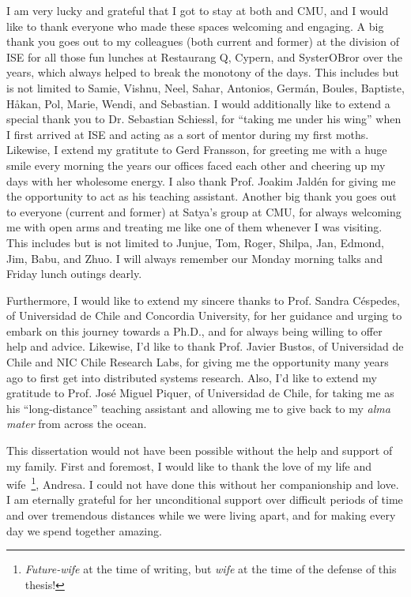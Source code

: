I am very lucky and grateful that I got to stay at both  and \gls{CMU}, and I would like to thank everyone who made these spaces welcoming and engaging.
A big thank you goes out to my colleagues (both current and former) at the division of \gls{ISE} for all those fun lunches at Restaurang Q, Cypern, and SysterOBror over the years, which always helped to break the monotony of the days.
This includes but is not limited to Samie, Vishnu, Neel, Sahar, Antonios, Germán, Boules, Baptiste, Håkan, Pol, Marie, Wendi, and Sebastian.
I would additionally like to extend a special thank you to Dr. Sebastian Schiessl, for ``taking me under his wing'' when I first arrived at \gls{ISE} and acting as a sort of mentor during my first moths.
Likewise, I extend my gratitute to Gerd Fransson, for greeting me with a huge smile every morning the years our offices faced each other and cheering up my days with her wholesome energy.
I also thank Prof. Joakim Jaldén for giving me the opportunity to act as his teaching assistant.
Another big thank you goes out to everyone (current and former) at Satya's group at \gls{CMU}, for always welcoming me with open arms and treating me like one of them whenever I was visiting.
This includes but is not limited to Junjue, Tom, Roger, Shilpa, Jan, Edmond, Jim, Babu, and Zhuo.
I will always remember our Monday morning talks and Friday lunch outings dearly.

Furthermore, I would like to extend my sincere thanks to Prof. Sandra Céspedes, of Universidad de Chile and Concordia University, for her guidance and urging to embark on this journey towards a Ph.D., and for always being willing to offer help and advice.
Likewise, I'd like to thank Prof. Javier Bustos, of Universidad de Chile and NIC Chile Research Labs, for giving me the opportunity many years ago to first get into distributed systems research.
Also, I'd like to extend my gratitude to Prof. José Miguel Piquer, of Universidad de Chile, for taking me as his ``long-distance'' teaching assistant and allowing me to give back to my \emph{alma mater} from across the ocean.

\medskip

This dissertation would not have been possible without the help and support of my family.
First and foremost, I would like to thank the love of my life and wife~\footnote{\emph{Future-wife} at the time of writing, but \emph{wife} at the time of the defense of this thesis!}, Andresa.
I could not have done this without her companionship and love.
I am eternally grateful for her unconditional support over difficult periods of time and over tremendous distances while we were living apart, and for making every day we spend together amazing.

